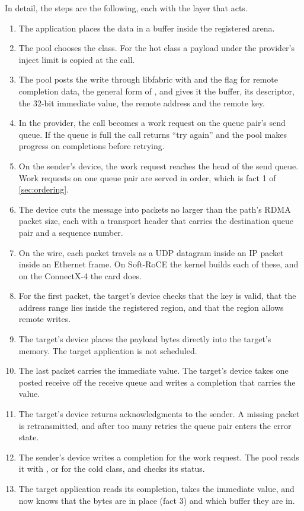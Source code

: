 In detail, the steps are the following, each with the layer that acts.

\begin{enumerate}
  \item The application places the data in a buffer inside the registered
        arena.
  \item The pool chooses the class. For the hot class a payload under the
        provider's inject limit is copied at the call.
  \item The pool posts the write through libfabric with 
        and the flag for remote completion data, the general form of
        , and gives it the buffer, its descriptor, the
        32-bit immediate value, the remote address and the remote key.
  \item In the provider, the call becomes a work request on the queue pair's
        send queue. If the queue is full the call returns ``try again'' and
        the pool makes progress on completions before retrying.
  \item On the sender's device, the work request reaches the head of the
        send queue. Work requests on one queue pair are served in order,
        which is fact 1 of \cref{sec:ordering}.
  \item The device cuts the message into packets no larger than the path's
        RDMA packet size, each with a transport header that carries the
        destination queue pair and a sequence number.
  \item On the wire, each packet travels as a UDP datagram inside an IP
        packet inside an Ethernet frame. On Soft-RoCE the kernel builds each
        of these, and on the ConnectX-4 the card does.
  \item For the first packet, the target's device checks that the key is
        valid, that the address range lies inside the registered region, and
        that the region allows remote writes.
  \item The target's device places the payload bytes directly into the
        target's memory. The target application is not scheduled.
  \item The last packet carries the immediate value. The target's device
        takes one posted receive off the receive queue and writes a
        completion that carries the value.
  \item The target's device returns acknowledgments to the sender. A missing
        packet is retransmitted, and after too many retries the queue pair
        enters the error state.
  \item The sender's device writes a completion for the work request. The
        pool reads it with , or  for the
        cold class, and checks its status.
  \item The target application reads its completion, takes the immediate
        value, and now knows that the bytes are in place (fact 3) and which
        buffer they are in.
\end{enumerate}

